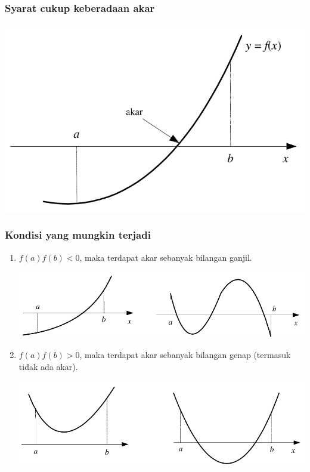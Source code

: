 \documentclass[pdflatex,compress]{beamer}
\begin{document}
\begin{frame}
	\frametitle{Syarat cukup keberadaan akar}
	\begin{center}
		\includegraphics[width=1\linewidth]{img/img01}
	\end{center}
\end{frame}

\begin{frame}
	\frametitle{Kondisi yang mungkin terjadi}
	\begin{enumerate}
		\item $ f(a)f(b) < 0 $, maka terdapat akar sebanyak bilangan ganjil.
		\begin{center}
			\includegraphics[width=0.8\linewidth]{img/img02}
		\end{center}
		\item $ f(a)f(b) > 0 $, maka terdapat akar sebanyak bilangan genap (termasuk tidak ada akar).
		\begin{center}
			\includegraphics[width=0.8\linewidth]{img/img03}
		\end{center}
	\end{enumerate}
\end{frame}
\end{document}
